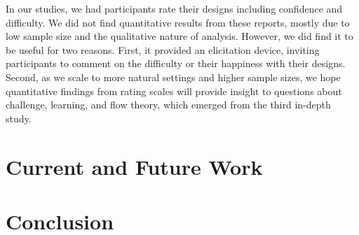 In our studies, we had participants rate their designs including confidence and difficulty.
We did not find quantitative results from these reports, mostly due to low sample size and the qualitative nature of analysis.
However, we did find it to be useful for two reasons.
First, it provided an elicitation device, inviting participants to comment on the difficulty or their happiness with their designs.
Second, as we scale to more natural settings and higher sample sizes, we hope quantitative findings from rating scales will provide insight to questions about challenge, learning, and flow theory, which emerged from the third in-depth study.




%
%
\section{Current and Future Work}



%
%
\section{Conclusion}





